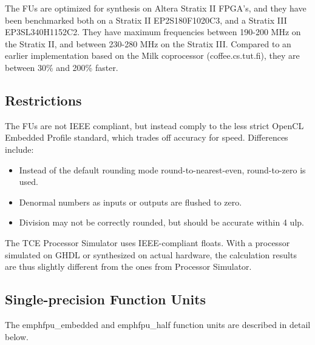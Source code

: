 \documentclass[twoside]{tceusermanual}
\begin{document}
The FUs are optimized for synthesis on Altera Stratix II FPGA's, and they have been 
benchmarked both on a Stratix II EP2S180F1020C3, and a Stratix III 
EP3SL340H1152C2. They have maximum frequencies between 190-200 MHz on the 
Stratix II, and between 230-280 MHz on the Stratix III. 
Compared to an earlier implementation based on the Milk coprocessor 
(coffee.cs.tut.fi), they are between 30\% and 200\% faster.

\subsection{Restrictions}

The FUs are not IEEE compliant, but instead comply to the less strict OpenCL 
Embedded Profile standard, which trades off accuracy for speed. Differences include:

\begin{itemize}
    \item Instead of the default rounding mode round-to-nearest-even, round-to-zero is used.
    \item Denormal numbers as inputs or outputs are flushed to zero.
    \item Division may not be correctly rounded, but should be accurate within 4 ulp.
\end{itemize}

The TCE Processor Simulator uses IEEE-compliant floats. With a processor simulated on GHDL or 
synthesized on actual hardware, the calculation results are thus slightly different from the 
ones from Processor Simulator.

\subsection{Single-precision Function Units}

The emph{fpu\_embedded} and emph{fpu\_half} function units are described in detail below.
\end{document}

